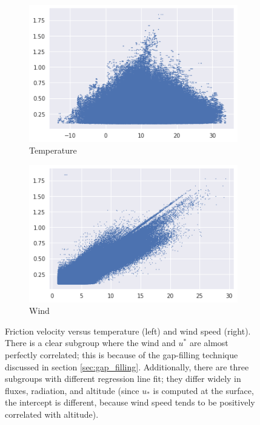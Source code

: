 \documentclass[a4paper]{book}
\begin{document}
\begin{figure}
    \centering
    \begin{subfigure}[t]{0.48\textwidth}
        \centering
        \includegraphics[width=\textwidth]{images/ustar_temp}
        \caption{Temperature}
        \label{fig:ustar_temp}
    \end{subfigure}
    \hfill
    \begin{subfigure}[t]{0.48\textwidth}
        \centering
        \includegraphics[width=\textwidth]{images/ustar_wind}
        \caption{Wind}
        \label{fig:ustar_wind}
    \end{subfigure}
    \caption{Friction velocity versus temperature (left) and wind speed (right). There is a clear subgroup where the wind and $u^*$ are almost perfectly correlated; this is because of the gap-filling technique discussed in section \ref{sec:gap_filling}. Additionally, there are three subgroups with different regression line fit; they differ widely in fluxes, radiation, and altitude (since $u_*$ is computed at the surface, the intercept is different, because wind speed tends to be positively correlated with altitude).}
	\label{fig:ustar_wind_temp}
\end{figure}
\end{document}
